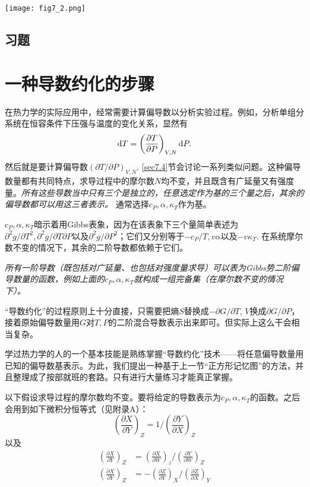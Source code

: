 {
	\centering
	\texttt{[image: fig7\_2.png]}
	\figcaption{}
	\label{fig7.2}
}

\subsection*{习题}


\section{一种导数约化的步骤}
\label{sec7.3}
在热力学的实际应用中，经常需要计算偏导数以分析实验过程。例如，分析单组分系统在恒容条件下压强与温度的变化关系，显然有
\begin{equation}
	\mathrm{d} T = \left( \frac{\partial T}{\partial P} \right)_{V, N} \mathrm{d} P.
\label{equ7.32}
\end{equation}
然后就是要计算偏导数$(\partial T / \partial P)_{V, N}$. \ref{sec7.4}节会讨论一系列类似问题。这种偏导数量都有共同特点，求导过程中的摩尔数$N$均不变，并且既含有广延量又有强度量。{\it 所有这些导数当中只有三个是独立的，任意选定作为基的三个量之后，其余的偏导数都可以用这三者表示。} 通常选择$c_P, \alpha, \kappa_T$作为基。

$c_P, \alpha, \kappa_T$暗示着用Gibbs表象，因为在该表象下三个量简单表述为$\partial^2 g / \partial T^2, \partial^2 g / \partial T \partial P$以及$\partial^2 g / \partial P^2$；它们又分别等于$-c_P / T, v\alpha$以及$-v \kappa_T$. 在系统摩尔数不变的情况下，其余的二阶导数都依赖于它们。

{\it 所有一阶导数（既包括对广延量、也包括对强度量求导）可以表为Gibbs势二阶偏导数量的函数，例如上面的$c_P, \alpha, \kappa_T$就构成一组完备集（在摩尔数不变的情况下）。}

“导数约化”的过程原则上十分直接，只需要把熵$S$替换成$-\partial G / \partial T$, $V$换成$\partial G / \partial P$，接着原始偏导数量用$G$对$T, P$的二阶混合导数表示出来即可。但实际上这么干会相当复杂。

学过热力学的人的一个基本技能是熟练掌握“导数约化”技术——将任意偏导数量用已知的偏导数基表示。为此，我们提出一种基于上一节“正方形记忆图”的方法，并且整理成了按部就班的套路。只有进行大量练习才能真正掌握。

以下假设求导过程的摩尔数均不变。要将给定的导数表示为$c_P, \alpha, \kappa_T$的函数。之后会用到如下微积分恒等式（见附录A）：
\begin{equation}
	\left( \frac{\partial X}{\partial Y} \right)_Z = 1 \Big/ \left(\frac{\partial Y}{\partial X} \right)_Z 
\label{equ7.33}
\end{equation}
以及
\begin{align}
	\left( \frac{\partial X}{\partial Y} \right)_Z &= \left( \frac{\partial X}{\partial W} \right)_z \Bigg/ \left( \frac{\partial Y}{\partial W} \right)_Z \label{equ7.34} \\
	\left( \frac{\partial X}{\partial Y} \right)_Z &= - \left( \frac{\partial Z}{\partial Y} \right)_X \Bigg/ \left( \frac{\partial Z}{\partial X} \right)_Y \label{equ7.35}
\end{align}

